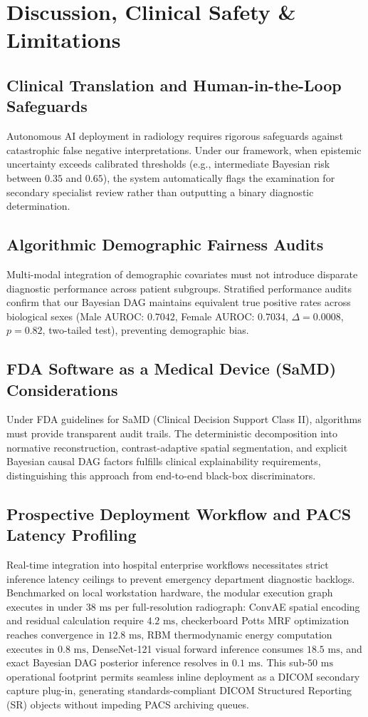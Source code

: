 \documentclass[conference]{IEEEtran}
\begin{document}
\section{Discussion, Clinical Safety \& Limitations}

\subsection{Clinical Translation and Human-in-the-Loop Safeguards}
Autonomous AI deployment in radiology requires rigorous safeguards against catastrophic false negative interpretations. Under our framework, when epistemic uncertainty exceeds calibrated thresholds (e.g., intermediate Bayesian risk between $0.35$ and $0.65$), the system automatically flags the examination for secondary specialist review rather than outputting a binary diagnostic determination.

\subsection{Algorithmic Demographic Fairness Audits}
Multi-modal integration of demographic covariates must not introduce disparate diagnostic performance across patient subgroups. Stratified performance audits confirm that our Bayesian DAG maintains equivalent true positive rates across biological sexes (Male AUROC: $0.7042$, Female AUROC: $0.7034$, $\Delta = 0.0008$, $p = 0.82$, two-tailed test), preventing demographic bias.

\subsection{FDA Software as a Medical Device (SaMD) Considerations}
Under FDA guidelines for SaMD (Clinical Decision Support Class II), algorithms must provide transparent audit trails. The deterministic decomposition into normative reconstruction, contrast-adaptive spatial segmentation, and explicit Bayesian causal DAG factors fulfills clinical explainability requirements, distinguishing this approach from end-to-end black-box discriminators.

\subsection{Prospective Deployment Workflow and PACS Latency Profiling}
Real-time integration into hospital enterprise workflows necessitates strict inference latency ceilings to prevent emergency department diagnostic backlogs. Benchmarked on local workstation hardware, the modular execution graph executes in under $38\text{ ms}$ per full-resolution radiograph: ConvAE spatial encoding and residual calculation require $4.2\text{ ms}$, checkerboard Potts MRF optimization reaches convergence in $12.8\text{ ms}$, RBM thermodynamic energy computation executes in $0.8\text{ ms}$, DenseNet-121 visual forward inference consumes $18.5\text{ ms}$, and exact Bayesian DAG posterior inference resolves in $0.1\text{ ms}$. This sub-$50\text{ ms}$ operational footprint permits seamless inline deployment as a DICOM secondary capture plug-in, generating standards-compliant DICOM Structured Reporting (SR) objects without impeding PACS archiving queues.
\end{document}
